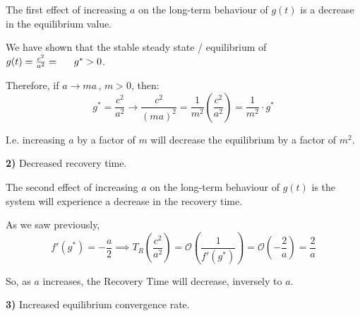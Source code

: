 \documentclass[]{article}
\begin{document}
The first effect of increasing $a$ on the long-term behaviour of $g(t)$ is a \indent decrease in the equilibrium value. \newline

We have shown that the stable steady state / equilibrium of $g(t) = \frac{c^2}{a^2} = \indent g^*>0$. \newline

Therefore, if $a \to ma \, , \, m>0$, then:
\[g^* = \frac{c^2}{a^2} \to \frac{c^2}{(ma)^2} =\frac{1}{m^2} \left(\frac{c^2}{a^2}\right) = \frac{1}{m^2} \cdot g^* \]

I.e. increasing $a$ by a factor of $m$ will decrease the equilibrium by a factor \indent of $m^2$.\newline

\noindent \textbf{2)} Decreased recovery time. \newline

The second effect of increasing $a$ on the long-term behaviour of $g(t)$ is the \indent system will experience a decrease in the recovery time.\newline

As we saw previously, 
\[
f'(g^{*})=-\frac{a}{2} \implies T_R\left(\frac{c^2}{a^2} \right) = \mathcal{O}\left(\frac{1}{f'(g^*)} \right) =  \mathcal{O}\left(-\frac{2}{a} \right) = \frac{2}{a}
\]

So, as $a$ increases, the Recovery Time will decrease, inversely to $a$.\newline

\noindent \textbf{3)} Increased equilibrium convergence rate. \newline
\end{document}

